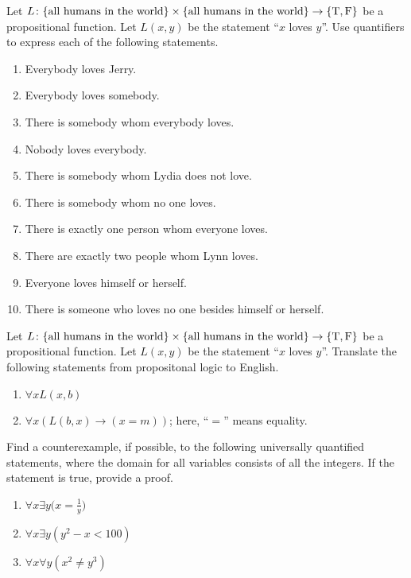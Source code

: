 \documentclass[../main.tex]{subfiles}
\begin{document}
\begin{homework}
    Let $L\colon \{\text{all humans in the world}\} \times \{\text{all humans in the world}\}\rightarrow \{\text T, \text F\}$ be a propositional function. Let $L(x, y)$ be the statement ``$x$ loves $y$''. Use quantifiers to express each of the following statements.
    \begin{enumerate}[label=(\alph*)]
        \item Everybody loves Jerry.
        \item Everybody loves somebody.
        \item There is somebody whom everybody loves. 
        \item Nobody loves everybody. 
        \item There is somebody whom Lydia does not love.
        \item There is somebody whom no one loves.
        \item There is exactly one person whom everyone loves. 
        \item There are exactly two people whom Lynn loves.
        \item Everyone loves himself or herself. 
        \item There is someone who loves no one besides himself or herself. 
    \end{enumerate} 
\end{homework}
\begin{homework}
    Let $L\colon\{\text{all humans in the world}\} \times \{\text{all humans in the world}\}\rightarrow \{\text T, \text F\}$ be a propositional function. Let $L(x, y)$ be the statement ``$x$ loves $y$''. Translate the following statements from propositonal logic to English.
    \begin{enumerate}[label=(\alph*)]
        \item $\forall xL(x,b)$
        \item $\forall x(L(b,x)\to (x=m))$; here, ``$=$'' means equality.
    \end{enumerate}
\end{homework}
\begin{homework}
    Find a counterexample, if possible, to the following universally quantified statements, where the domain for all variables consists of all the integers. If the statement is true, provide a proof.
    \begin{enumerate}[label=(\alph*)]
        \item $\forall x \exists y \big(x = \frac{1}{y}\big)$
        \item $\forall x \exists y \left(y^2 - x < 100\right)$ 
        \item $\forall x \forall y \left(x^2 \neq y^3\right)$
    \end{enumerate}
\end{homework}
\end{document}
